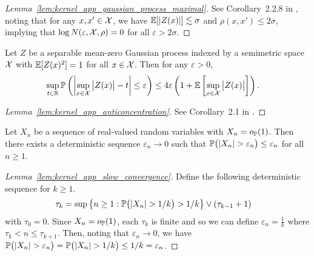\begin{proof}[Lemma~\ref{lem:kernel_app_gaussian_process_maximal}]

  See Corollary~2.2.8 in \citet{van1996weak},
  noting that for any $x,x' \in \cX$, we have
  $\E[|Z(x)|] \lesssim \sigma$ and
  $\rho(x,x') \leq 2\sigma$,
  implying that
  $\log N(\varepsilon, \cX, \rho) = 0$
  for all
  $\varepsilon > 2 \sigma$.
\end{proof}

\begin{lemma}
  \label{lem:kernel_app_anticoncentration}

  Let $Z$ be a separable mean-zero Gaussian process
  indexed by a semimetric space $\cX$ with
  $\E[Z(x)^2] = 1$
  for all $x \in \cX$.
  Then for any $\varepsilon > 0$,
  \begin{align*}
    \sup_{t \in \R}
    \P\left(
      \left|
      \sup_{x \in \cX}
      \big| Z(x) \big|
      - t
      \right|
      \leq \varepsilon
    \right)
    &\leq
    4 \varepsilon
    \left(
      1 + \E\left[
        \sup_{x \in \cX}
        \big| Z(x) \big|
      \right]
    \right).
  \end{align*}

\end{lemma}

\begin{proof}[Lemma~\ref{lem:kernel_app_anticoncentration}]

  See Corollary~2.1
  in \citet{chernozhukov2014anti}.
\end{proof}

\begin{lemma}
  \label{lem:kernel_app_slow_convergence}

  Let $X_n$ be a sequence of real-valued random
  variables with
  $X_n = o_\P(1)$.
  Then there exists a deterministic sequence
  $\varepsilon_n \to 0$
  such that
  $\P\big(|X_n| > \varepsilon_n\big) \leq \varepsilon_n$
  for all $n \geq 1$.

\end{lemma}

\begin{proof}[Lemma~\ref{lem:kernel_app_slow_convergence}]

  Define the following deterministic sequence
  for $k \geq 1$.
  \begin{align*}
    \tau_k
    &=
    \sup
    \big\{
      n \geq 1:
      \P\big(|X_n| > 1/k\big)
      > 1/k
    \big\}
    \vee
    (\tau_{k-1} +1)
  \end{align*}
  with $\tau_0 = 0$.
  Since $X_n = o_\P(1)$,
  each $\tau_k$ is finite
  and so we can define
  $\varepsilon_n = \frac{1}{k}$
  where $\tau_k < n \leq \tau_{k+1}$.
  Then, noting that $\varepsilon_n \to 0$,
  we have
  $\P\big(|X_n| > \varepsilon_n\big)
  = \P\big(|X_n| > 1/k\big) \leq 1/k = \varepsilon_n$.
\end{proof}

